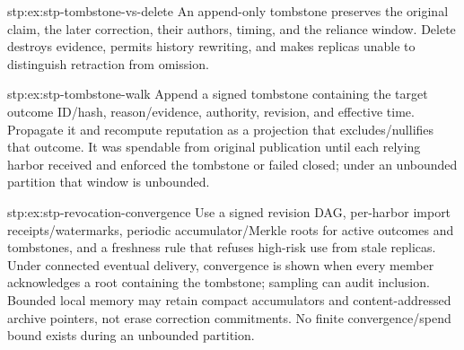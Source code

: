 \begin{pdSolution}{stp:ex:stp-tombstone-vs-delete}
An append-only tombstone preserves the original claim, the later correction,
their authors, timing, and the reliance window. Delete destroys evidence,
permits history rewriting, and makes replicas unable to distinguish
retraction from omission.
\end{pdSolution}
\begin{pdSolution}{stp:ex:stp-tombstone-walk}
Append a signed tombstone containing the target outcome ID/hash,
reason/evidence, authority, revision, and effective time. Propagate it and
recompute reputation as a projection that excludes/nullifies that outcome.
It was spendable from original publication until each relying harbor
received and enforced the tombstone or failed closed; under an unbounded
partition that window is unbounded.
\end{pdSolution}
\begin{pdSolution}{stp:ex:stp-revocation-convergence}
Use a signed revision DAG, per-harbor import receipts/watermarks, periodic
accumulator/Merkle roots for active outcomes and tombstones, and a freshness
rule that refuses high-risk use from stale replicas. Under connected
eventual delivery, convergence is shown when every member acknowledges a
root containing the tombstone; sampling can audit inclusion. Bounded local
memory may retain compact accumulators and content-addressed archive
pointers, not erase correction commitments. No finite convergence/spend
bound exists during an unbounded partition.
\end{pdSolution}
